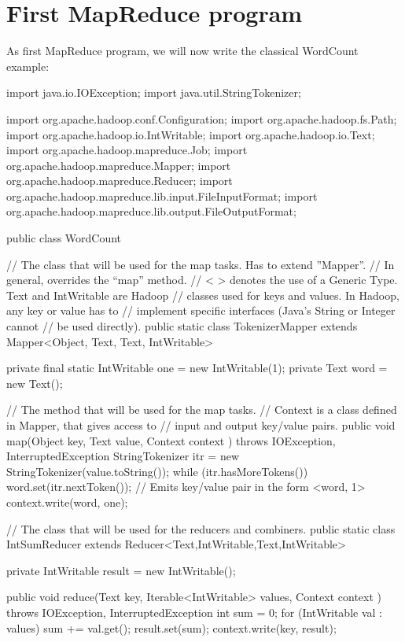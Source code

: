 \documentclass[11pt]{article}
\begin{document}
\section{First MapReduce program}

As first MapReduce program, we will now write the classical WordCount example:
\begin{java}
  import java.io.IOException;
  import java.util.StringTokenizer;
  
  import org.apache.hadoop.conf.Configuration;
  import org.apache.hadoop.fs.Path;
  import org.apache.hadoop.io.IntWritable;
  import org.apache.hadoop.io.Text;
  import org.apache.hadoop.mapreduce.Job;
  import org.apache.hadoop.mapreduce.Mapper;
  import org.apache.hadoop.mapreduce.Reducer;
  import org.apache.hadoop.mapreduce.lib.input.FileInputFormat;
  import org.apache.hadoop.mapreduce.lib.output.FileOutputFormat;

  public class WordCount {

    // The class that will be used for the map tasks. Has to extend ''Mapper''.
    // In general, overrides the ``map'' method.
    // < > denotes the use of a Generic Type.  Text and IntWritable are Hadoop
    // classes used for keys and values. In Hadoop, any key or value has to
    // implement specific interfaces (Java's String or Integer cannot
    // be used directly). 
    public static class TokenizerMapper
    extends Mapper<Object, Text, Text, IntWritable>{

      private final static IntWritable one = new IntWritable(1);
      private Text word = new Text();

      // The method that will be used for the map tasks.
      // Context is a class defined in Mapper, that gives access to
      // input and output key/value pairs.
      public void map(Object key, Text value, Context context
      ) throws IOException, InterruptedException {
        StringTokenizer itr = new StringTokenizer(value.toString());
        while (itr.hasMoreTokens()) {
          word.set(itr.nextToken());
          // Emits key/value pair in the form <word, 1>
          context.write(word, one);
        }
      }
    }

    // The class that will be used for the reducers and combiners.
    public static class IntSumReducer
    extends Reducer<Text,IntWritable,Text,IntWritable> {
      private IntWritable result = new IntWritable();
      
      public void reduce(Text key, Iterable<IntWritable> values,
      Context context
      ) throws IOException, InterruptedException {
        int sum = 0;
        for (IntWritable val : values) {
          sum += val.get();
        }
        result.set(sum);
        context.write(key, result);
      }
    }

}
\end{java}
\end{document}
